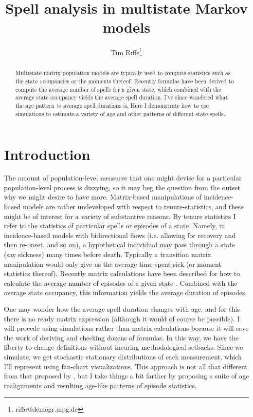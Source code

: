 \documentclass{article}
\begin{document}
\title{Spell analysis in multistate Markov models}
\author[1]{Tim Riffe\thanks{riffe@demogr.mpg.de}}
\maketitle

\begin{abstract}
Multistate matrix population models are typically used to compute statistics
such as the state occupancies or the moments thereof. Recently formulas
have been derived to compute the average number of spells for a given state,
which combined with the average state occupancy yields the average spell
duration. I've since wondered what the age pattern to average spell durations
is. Here I demonstrate how to use simulations to estimate a variety of age and
other patterns of different state spells. 
\end{abstract}

\section{Introduction}
The amount of population-level measures that one might devise for a particular
population-level process is dizzying, so it may beg the question from the outset
why we might desire to have more. Matrix-based manipulations of incidence-based
models are rather undeveloped with respect to tenure-statistics, and these might
be of interest for a variety of substantive reasons. By tenure statistics I
refer to the statistics of particular spells or episodes of a state. Namely, in
incidence-based models with bidirectional flows (i.e. allowing for recovery and
then re-onset, and so on), a hypothetical individual may pass through a state
(say sickness) many times before death. Typically a transition matrix
manipulation would only give us the average time spent sick (or moment
statistics thereof). Recently matrix calculations have been described for how to
calculate the average number of episodes of a given state \citep{dudel2017b}.
Combined with the average state occupancy, this information yields the average
duration of episodes.

One may wonder how the average spell duration changes with age, and for this
there is no ready matrix expression (although it would of course be possible). I
will procede using simulations rather than matrix calculations because it will
save the work of deriving and checking dozens of formulas. In this way, we have
the liberty to change definitions without incuring methodological setbacks.
Since we simulate, we get stochastic stationary distributions of each
measurement, which I'll represent using fan-chart visualizations. This approach is not all that different from
that proposed by \citet{laditka1998new}, but I take things a bit
farther by proposing a suite of age realignments and resulting age-like patterns of episode
statistics. 
\end{document}
